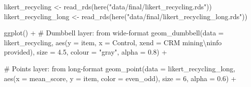 \documentclass[
  letterpaper,
  DIV=11,
  numbers=noendperiod]{scrartcl}
\newenvironment{Shaded}{\begin{snugshade}}{\end{snugshade}}
\newcommand{\AttributeTok}[1]{\textcolor[rgb]{0.40,0.45,0.13}{#1}}
\newcommand{\CommentTok}[1]{\textcolor[rgb]{0.37,0.37,0.37}{#1}}
\newcommand{\DecValTok}[1]{\textcolor[rgb]{0.68,0.00,0.00}{#1}}
\newcommand{\FloatTok}[1]{\textcolor[rgb]{0.68,0.00,0.00}{#1}}
\newcommand{\FunctionTok}[1]{\textcolor[rgb]{0.28,0.35,0.67}{#1}}
\newcommand{\NormalTok}[1]{\textcolor[rgb]{0.00,0.23,0.31}{#1}}
\newcommand{\OtherTok}[1]{\textcolor[rgb]{0.00,0.23,0.31}{#1}}
\newcommand{\SpecialCharTok}[1]{\textcolor[rgb]{0.37,0.37,0.37}{#1}}
\newcommand{\StringTok}[1]{\textcolor[rgb]{0.13,0.47,0.30}{#1}}
\begin{document}
\begin{Shaded}
\begin{Highlighting}[]
\NormalTok{likert\_recycling }\OtherTok{\textless{}{-}} \FunctionTok{read\_rds}\NormalTok{(}\FunctionTok{here}\NormalTok{(}\StringTok{"data/final/likert\_recycling.rds"}\NormalTok{))}
\NormalTok{likert\_recycling\_long }\OtherTok{\textless{}{-}} \FunctionTok{read\_rds}\NormalTok{(}\FunctionTok{here}\NormalTok{(}\StringTok{"data/final/likert\_recycling\_long.rds"}\NormalTok{))}

\FunctionTok{ggplot}\NormalTok{() }\SpecialCharTok{+}
  \CommentTok{\# Dumbbell layer: from wide{-}format}
  \FunctionTok{geom\_dumbbell}\NormalTok{(}\AttributeTok{data =}\NormalTok{ likert\_recycling,}
                \FunctionTok{aes}\NormalTok{(}\AttributeTok{y =}\NormalTok{ item, }\AttributeTok{x =}\NormalTok{ Control, }\AttributeTok{xend =} \StringTok{\textasciigrave{}}\AttributeTok{CRM mining}\SpecialCharTok{\textbackslash{}n}\AttributeTok{info provided}\StringTok{\textasciigrave{}}\NormalTok{),}
                \AttributeTok{size =} \FloatTok{4.5}\NormalTok{,}
                \AttributeTok{colour =} \StringTok{"gray"}\NormalTok{,}
                \AttributeTok{alpha =} \FloatTok{0.8}\NormalTok{) }\SpecialCharTok{+}
  
  \CommentTok{\# Points layer: from long{-}format}
  \FunctionTok{geom\_point}\NormalTok{(}\AttributeTok{data =}\NormalTok{ likert\_recycling\_long,}
             \FunctionTok{aes}\NormalTok{(}\AttributeTok{x =}\NormalTok{ mean\_score, }\AttributeTok{y =}\NormalTok{ item, }\AttributeTok{color =}\NormalTok{ even\_odd),}
             \AttributeTok{size =} \DecValTok{6}\NormalTok{,}
             \AttributeTok{alpha =} \FloatTok{0.6}\NormalTok{) }\SpecialCharTok{+}
  

\end{Highlighting}
\end{Shaded}
\end{document}
